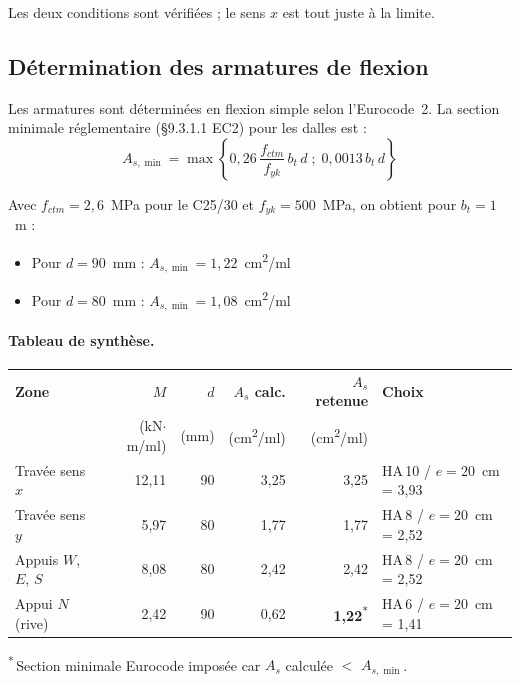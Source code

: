 Les deux conditions sont vérifiées ; le sens $x$ est tout juste à la limite.

\subsection{Détermination des armatures de flexion}

Les armatures sont déterminées en flexion simple selon l'Eurocode~2. La section minimale réglementaire (\S{}9.3.1.1 EC2) pour les dalles est :
\[
  A_{s,\min} = \max\left\{0{,}26\,\frac{f_{ctm}}{f_{yk}}\,b_t\,d \;;\; 0{,}0013\,b_t\,d\right\}
\]

Avec $f_{ctm} = 2{,}6$~MPa pour le C25/30 et $f_{yk} = 500$~MPa, on obtient pour $b_t = 1$~m :
\begin{itemize}
  \item Pour $d = 90$~mm : $A_{s,\min} = 1{,}22$~cm\textsuperscript{2}/ml
  \item Pour $d = 80$~mm : $A_{s,\min} = 1{,}08$~cm\textsuperscript{2}/ml
\end{itemize}

\paragraph{Tableau de synthèse.}

\vspace{4pt}
\begin{center}
\renewcommand{\arraystretch}{1.4}
\begin{tabular}{lrrrrl}
\toprule
\textbf{Zone} & \textbf{$M$} & \textbf{$d$} & \textbf{$A_s$ calc.} & \textbf{$A_s$ retenue} & \textbf{Choix} \\
              & (kN$\cdot$m/ml) & (mm) & (cm\textsuperscript{2}/ml) & (cm\textsuperscript{2}/ml) & \\
\midrule
Travée sens $x$       & 12,11 & 90 & 3,25 & 3,25 & HA\,10 / $e = 20$~cm = 3,93 \\
Travée sens $y$       & 5,97  & 80 & 1,77 & 1,77 & HA\,8 / $e = 20$~cm = 2,52 \\
Appuis $W$, $E$, $S$  & 8,08  & 80 & 2,42 & 2,42 & HA\,8 / $e = 20$~cm = 2,52 \\
Appui $N$ (rive)      & 2,42  & 90 & 0,62 & \textbf{1,22}\textsuperscript{*} & HA\,6 / $e = 20$~cm = 1,41 \\
\bottomrule
\end{tabular}
\end{center}
\textsuperscript{*}\,Section minimale Eurocode imposée car $A_s$ calculée $<$ $A_{s,\min}$.
\vspace{4pt}

